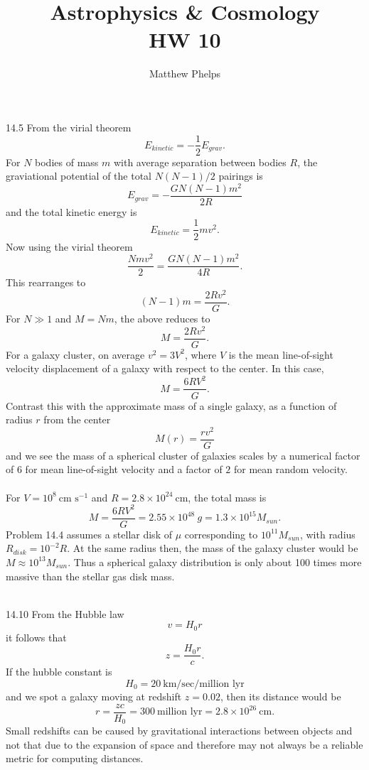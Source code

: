 \documentclass[10pt,letterpaper]{article}
\title{Astrophysics \& Cosmology\\HW 10}
\author{Matthew Phelps}
\date{}
\begin{document}
\maketitle

\benum

\item[14.5]
From the virial theorem 
\[
	E_{kinetic} = -\frac12 E_{grav}.
\]
For $N$ bodies of mass $m$ with average separation between bodies $R$, the graviational potential of the total $N(N-1)/2$ pairings is
\[
	E_{grav} = -\frac{GN(N-1)m^2}{2R}
\]
and the total kinetic energy is 
\[
	E_{kinetic} = \frac12 mv^2.
\]
Now using the virial theorem
\[
	\frac{Nmv^2}{2} = \frac{GN(N-1)m^2}{4R}.
\]
This rearranges to 
\[
	(N-1)m = \frac{2Rv^2}{G}.
\]
For $N\gg 1$ and $M=Nm$, the above reduces to
\[
	M = \frac{2Rv^2}{G}.
\]
For a galaxy cluster, on average $v^2 = 3V^2$, where $V$ is the mean line-of-sight velocity displacement of a galaxy with respect to the center. In this case,
\[
	M = \frac{6RV^2}{G}
.\]
Contrast this with the approximate mass of a single galaxy, as a function of radius $r$ from the center
\[
	M(r) = \frac{rv^2}{G}
\]
and we see the mass of a spherical cluster of galaxies scales by a numerical factor of $6$ for mean line-of-sight velocity and a factor of $2$ for mean random velocity. \\ \\
For $V = 10^8\ \text{cm s}^{-1}$ and $R = 2.8\times 10^{24}\ \text{cm}$, the total mass is
\[
	M = \frac{6RV^2}{G} = 2.55\times 10^{48}\ {g} = 1.3\times 10^{15} M_{sun}.
\]
Problem 14.4 assumes a stellar disk of $\mu$ corresponding to $10^{11} M_{sun}$, with radius $R_{disk} = 10^{-2} R$. At the same radius then, the mass of the galaxy cluster would be $M \approx 10^{13} M_{sun}$. Thus a spherical galaxy distribution is only about 100 times more massive than the stellar gas disk mass. 
\\ \\
\item[14.10]
From the Hubble law
\[
	v = H_0 r
\]
it follows that
\[
	z = \frac{H_0 r}{c}.
\]
If the hubble constant is
\[
	H_0 = 20\ \text{km/sec/million lyr}
\]
and we spot a galaxy moving at redshift $z = 0.02$, then its distance would be
\[
	r = \frac{zc}{H_0} = 300\ \text{million lyr} = 2.8\times10^{26}\ \text{cm}.
\]
Small redshifts can be caused by gravitational interactions between objects and not that due to the expansion of space and therefore may not always be a reliable metric for computing distances. 
\eenum
\end{document}
